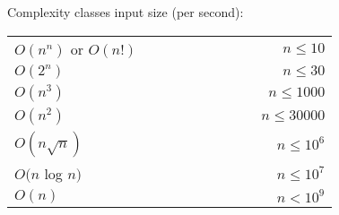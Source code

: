 Complexity classes input size (per second):

\vspace{0.2pt}

\begin{tabularx}{\textwidth}{p{0.76\linewidth} r}
$O(n^n)$ or $O(n!)$ & $n \leq 10$ \\
$O(2^n)$ &  $n \leq 30$ \\
$O(n^3)$ & $n \leq 1000$ \\
$O(n^2)$ & $n \leq 30000$ \\
$O(n \sqrt{n})$ & $n \leq 10^6$ \\
$O(n$ log $n)$ & $n \leq 10^7$ \\
$O(n)$ & $n < 10^9$
\end{tabularx}

\hrulefill

